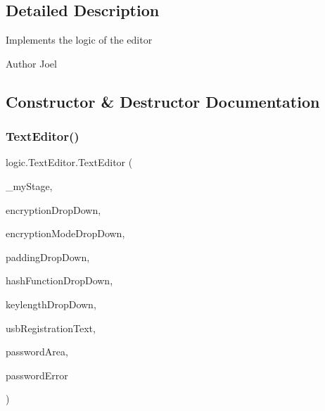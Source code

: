 \subsection{Detailed Description}
Implements the logic of the editor \begin{DoxyAuthor}{Author}
Joel 
\end{DoxyAuthor}


\subsection{Constructor \& Destructor Documentation}
\mbox{\label{classlogic_1_1_text_editor_a3bea784ecea25cb30c6229ff87f42aa6}} 
\subsubsection{\texorpdfstring{Text\+Editor()}{TextEditor()}}
{\footnotesize\ttfamily logic.\+Text\+Editor.\+Text\+Editor (\begin{DoxyParamCaption}\item[{Stage}]{\+\_\+my\+Stage,  }\item[{Combo\+Box$<$ \mbox{\hyperlink{enumenums_1_1_encryption_type}{Encryption\+Type}} $>$}]{encryption\+Drop\+Down,  }\item[{Combo\+Box$<$ \mbox{\hyperlink{enumenums_1_1_encryption_mode}{Encryption\+Mode}} $>$}]{encryption\+Mode\+Drop\+Down,  }\item[{Combo\+Box$<$ \mbox{\hyperlink{enumenums_1_1_padding_type}{Padding\+Type}} $>$}]{padding\+Drop\+Down,  }\item[{Combo\+Box$<$ \mbox{\hyperlink{enumenums_1_1_hash_function}{Hash\+Function}} $>$}]{hash\+Function\+Drop\+Down,  }\item[{Combo\+Box$<$ \mbox{\hyperlink{enumenums_1_1_key_length}{Key\+Length}} $>$}]{keylength\+Drop\+Down,  }\item[{Text}]{usb\+Registration\+Text,  }\item[{Password\+Field}]{password\+Area,  }\item[{Text}]{password\+Error }\end{DoxyParamCaption})}

